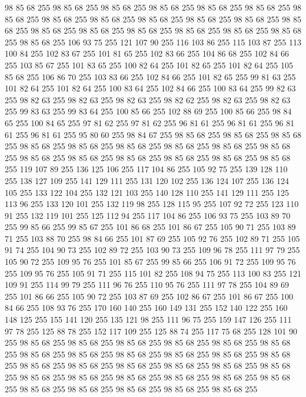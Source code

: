 98 85 68 255 98 85 68 255 98 85 68 255 98 85 68 255 98 85 68 255 98 85 68 255 98 85 68 255 98 85 68 255 98 85 68 255 98 85 68 255 98 85 68 255 98 85 68 255 98 85 68 255 98 85 68 255 98 85 68 255 98 85 68 255 98 85 68 255 98 85 68 255 98 85 68 255 98 85 68 255 106 93 75 255 121 107 90 255 116 103 86 255 115 103 87 255 113 100 84 255 102 83 67 255 101 81 65 255 102 83 66 255 104 86 68 255 102 84 66 255 103 85 67 255 101 83 65 255 100 82 64 255 101 82 65 255 101 82 64 255 105 85 68 255 106 86 70 255 103 83 66 255 102 84 66 255 101 82 65 255 99 81 63 255 101 82 64 255 101 82 64 255 100 83 64 255 102 84 66 255 100 83 64 255 99 82 63 255 98 82 63 255 98 82 63 255 98 82 63 255 98 82 62 255 98 82 63 255 98 82 63 255 99 83 63 255 99 83 64 255 100 85 66 255 102 88 69 255 100 85 66 255 98 84 65 255 100 84 65 255 97 81 62 255 97 81 62 255 96 81 61 255 96 81 61 255
96 81 61 255 96 81 61 255 95 80 60 255 98 84 67 255 98 85 68 255 98 85 68 255 98 85 68 255 98 85 68 255 98 85 68 255 98 85 68 255 98 85 68 255 98 85 68 255 98 85 68 255 98 85 68 255 98 85 68 255 98 85 68 255 98 85 68 255 98 85 68 255 98 85 68 255 119 107 89 255 136 125 106 255 117 104 86 255 105 92 75 255 139 128 110 255 138 127 109 255 141 129 111 255 131 120 102 255 136 124 107 255 136 124 105 255 133 122 104 255 132 121 103 255 140 128 110 255 141 129 111 255 125 113 96 255 133 120 101 255 132 119 98 255 128 115 95 255 107 92 72 255 123 110 91 255 132 119 101 255 125 112 94 255 117 104 86 255 106 93 75 255 103 89 70 255 99 85 66 255 99 85 67 255 101 86 68 255 101 86 67 255 105 90 71 255 103 89 71 255 103 88 70 255 98 84 66 255 101 87 69 255 105 92 76 255 102 89 71 255 105 91 74 255 104 90 73 255 102 89 72 255 103 90 73 255 109 96 78 255 111 97 79 255 105 90 72 255 109 95 76 255 101 85 67 255
99 85 66 255 106 91 72 255 109 95 76 255 109 95 76 255 105 91 71 255 115 101 82 255 108 94 75 255 113 100 83 255 121 109 91 255 114 99 79 255 111 96 76 255 110 95 76 255 111 97 78 255 104 89 69 255 101 86 66 255 105 90 72 255 103 87 69 255 102 86 67 255 101 86 67 255 100 84 66 255 108 93 76 255 170 160 140 255 160 149 131 255 152 140 122 255 160 148 125 255 155 141 120 255 135 121 98 255 111 96 75 255 159 147 126 255 111 97 78 255 125 88 78 255 152 117 109 255 125 88 74 255 117 75 68 255 128 101 90 255 98 85 68 255 98 85 68 255 98 85 68 255 98 85 68 255 98 85 68 255 98 85 68 255 98 85 68 255 98 85 68 255 98 85 68 255 98 85 68 255 98 85 68 255 98 85 68 255 98 85 68 255 98 85 68 255 98 85 68 255 98 85 68 255 98 85 68 255 98 85 68 255 98 85 68 255 98 85 68 255 98 85 68 255 98 85 68 255 98 85 68 255 98 85 68 255 98 85 68 255 98 85 68 255 98 85 68 255 98 85 68 255 98 85 68 255

